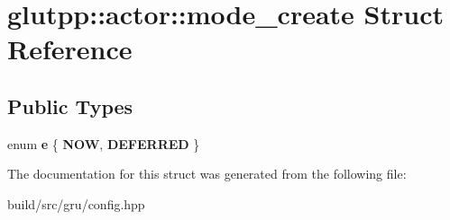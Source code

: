 \hypertarget{structglutpp_1_1actor_1_1mode__create}{\section{glutpp\-:\-:actor\-:\-:mode\-\_\-create \-Struct \-Reference}
\label{structglutpp_1_1actor_1_1mode__create}
}
\subsection*{\-Public \-Types}
\begin{DoxyCompactItemize}
\item 
enum {\bfseries e} \{ {\bfseries \-N\-O\-W}, 
{\bfseries \-D\-E\-F\-E\-R\-R\-E\-D}
 \}
\end{DoxyCompactItemize}


\-The documentation for this struct was generated from the following file\-:\begin{DoxyCompactItemize}
\item 
build/src/gru/config.\-hpp\end{DoxyCompactItemize}
